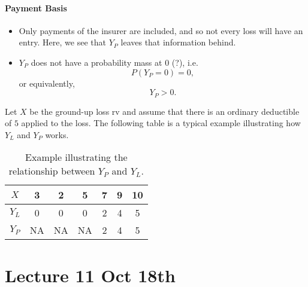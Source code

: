 \documentclass[notoc,notitlepage]{tufte-book}
\begin{document}

\subsubsection{Payment Basis}%
\label{ssub:payment_basis}

\begin{itemize}
  \item Only  payments of the insurer are included, and so not every loss will have an entry. Here, we see that $Y_P$ leaves that information behind.
  \item $Y_P$ does not have a probability mass at $0$ (?), i.e.
    \begin{equation*}
      P(Y_P = 0) = 0,
    \end{equation*}
    or equivalently,
    \begin{equation*}
      Y_P > 0.
    \end{equation*}
\end{itemize}


\begin{eg}
  Let $X$ be the ground-up loss rv and assume that there is an ordinary deductible of $5$ applied to the loss. The following table is a typical example illustrating how $Y_L$ and $Y_P$ works.
  \begin{table}[ht]
    \centering
    \caption{Example illustrating the relationship between $Y_P$ and $Y_L$.}
    \label{tab:example_for_yp_and_yp}
    \begin{tabular}{c | c c c c c c}
    \toprule
    $X$   & 3  & 2  & 5  & 7 & 9 & 10 \\
    \midrule
    $Y_L$ & 0  & 0  & 0  & 2 & 4 & 5 \\
    $Y_P$ & NA & NA & NA & 2 & 4 & 5 \\
    \bottomrule
    \end{tabular}
  \end{table}
\end{eg}




\chapter{Lecture 11 Oct 18th}%
\label{chp:lecture_11_oct_18th}
\end{document}
